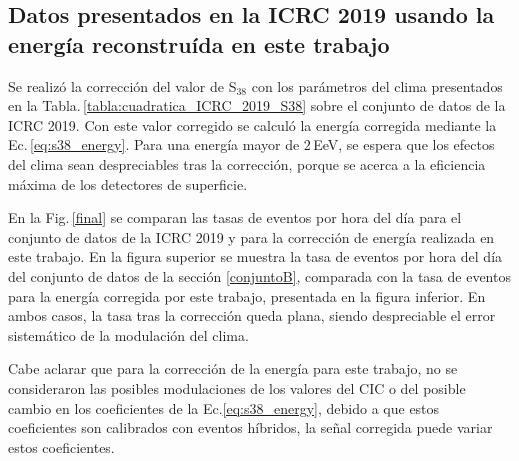 

\subsection{Datos presentados en la ICRC 2019 usando la energía reconstruída en este trabajo}

Se realizó la corrección del valor de S$_{38}$ con los parámetros del clima presentados en la Tabla.\,\ref{tabla:cuadratica_ICRC_2019_S38} sobre el conjunto de datos de la ICRC 2019. Con este valor corregido se calculó la energía corregida mediante la Ec.\,\ref{eq:s38_energy}. Para una energía mayor de $2\,$EeV, se espera que los efectos del clima sean despreciables tras la corrección, porque se acerca a la eficiencia máxima de los detectores de superficie. %

En la Fig.\,\ref{final} se comparan las tasas de eventos por hora del día para el conjunto de datos de la ICRC 2019 y para la corrección de energía realizada en este trabajo. En la figura superior se muestra la tasa de eventos por hora del día del conjunto de datos de la sección \ref{conjuntoB}, comparada con la tasa de eventos para la energía corregida por este trabajo, presentada en la figura inferior. En ambos casos, la tasa tras la corrección queda plana, siendo despreciable el error sistemático de la modulación del clima.

Cabe aclarar que para la corrección de la energía para este trabajo, no se consideraron las posibles modulaciones de los valores del CIC o del posible cambio en los coeficientes de la Ec.\ref{eq:s38_energy}, debido a que estos coeficientes son calibrados con eventos híbridos, la señal corregida puede variar estos coeficientes.

